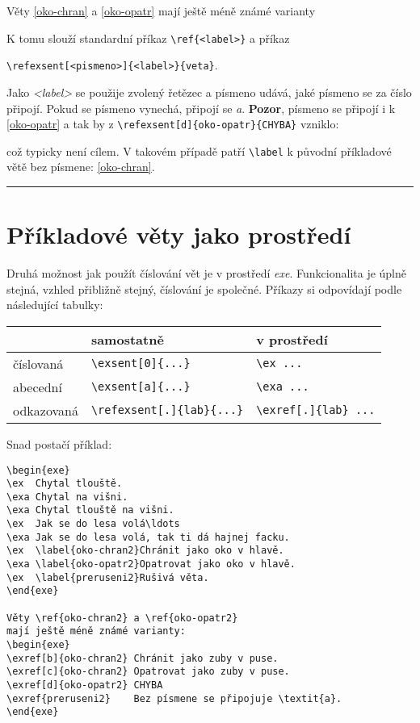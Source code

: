 \documentclass{pbmlbook}
\begin{document}
Věty \ref{oko-chran} a \ref{oko-opatr} mají ještě méně známé varianty

K tomu slouží standardní příkaz \verb!\ref{<label>}! a příkaz

\verb!\refexsent[<pismeno>]{<label>}{veta}!.

Jako \textit{<label>} se použije zvolený řetězec a
písmeno udává, jaké písmeno se za číslo připojí.
Pokud se písmeno vynechá, připojí se \textit{a}.
\textbf{Pozor}, písmeno se připojí i k \ref{oko-opatr} a tak by
z \verb!\refexsent[d]{oko-opatr}{CHYBA}! vzniklo:


což typicky není cílem.
V takovém případě patří \verb!\label! k původní příkladové větě
bez písmene: \ref{oko-chran}.

\hrule

\chapter*{Příkladové věty jako prostředí}

Druhá možnost jak použít číslování vět je v prostředí \textit{exe}.
Funkcionalita je úplně stejná, vzhled přibližně stejný, číslování je společné.
Příkazy si odpovídají podle následující tabulky:

\medskip
\begin{tabular}{|l|l|l|}
\hline
           & samostatně                     & v prostředí               \\
\hline
číslovaná  & \verb!\exsent[0]{...}!         & \verb!\ex ...!            \\
abecední   & \verb!\exsent[a]{...}!         & \verb!\exa ...!           \\
odkazovaná & \verb!\refexsent[.]{lab}{...}! & \verb!\exref[.]{lab} ...! \\
\hline
\end{tabular}
\bigskip

Snad postačí příklad:

\begin{verbatim}
\begin{exe}
\ex  Chytal tlouště.
\exa Chytal na višni.
\exa Chytal tlouště na višni.
\ex  Jak se do lesa volá\ldots
\exa Jak se do lesa volá, tak ti dá hajnej facku.
\ex  \label{oko-chran2}Chránit jako oko v hlavě.
\exa \label{oko-opatr2}Opatrovat jako oko v hlavě.
\ex  \label{preruseni2}Rušivá věta. 
\end{exe}

Věty \ref{oko-chran2} a \ref{oko-opatr2}
mají ještě méně známé varianty:
\begin{exe}
\exref[b]{oko-chran2} Chránit jako zuby v puse.
\exref[c]{oko-chran2} Opatrovat jako zuby v puse.
\exref[d]{oko-opatr2} CHYBA
\exref{preruseni2}    Bez písmene se připojuje \textit{a}.
\end{exe}
\end{verbatim}
\end{document}
